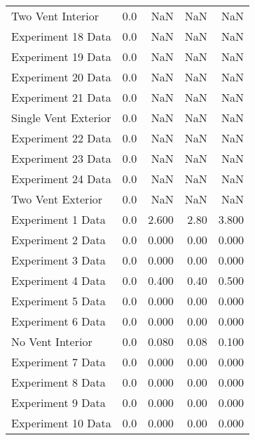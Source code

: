 \begin{tabular}{lrrrr}
Two Vent Interior    &       0.0 &              NaN &              NaN &        NaN \\
Experiment 18 Data   &       0.0 &              NaN &              NaN &        NaN \\
Experiment 19 Data   &       0.0 &              NaN &              NaN &        NaN \\
Experiment 20 Data   &       0.0 &              NaN &              NaN &        NaN \\
Experiment 21 Data   &       0.0 &              NaN &              NaN &        NaN \\
Single Vent Exterior &       0.0 &              NaN &              NaN &        NaN \\
Experiment 22 Data   &       0.0 &              NaN &              NaN &        NaN \\
Experiment 23 Data   &       0.0 &              NaN &              NaN &        NaN \\
Experiment 24 Data   &       0.0 &              NaN &              NaN &        NaN \\
Two Vent Exterior    &       0.0 &              NaN &              NaN &        NaN \\
Experiment 1 Data    &       0.0 &            2.600 &             2.80 &      3.800 \\
Experiment 2 Data    &       0.0 &            0.000 &             0.00 &      0.000 \\
Experiment 3 Data    &       0.0 &            0.000 &             0.00 &      0.000 \\
Experiment 4 Data    &       0.0 &            0.400 &             0.40 &      0.500 \\
Experiment 5 Data    &       0.0 &            0.000 &             0.00 &      0.000 \\
Experiment 6 Data    &       0.0 &            0.000 &             0.00 &      0.000 \\
No Vent Interior     &       0.0 &            0.080 &             0.08 &      0.100 \\
Experiment 7 Data    &       0.0 &            0.000 &             0.00 &      0.000 \\
Experiment 8 Data    &       0.0 &            0.000 &             0.00 &      0.000 \\
Experiment 9 Data    &       0.0 &            0.000 &             0.00 &      0.000 \\
Experiment 10 Data   &       0.0 &            0.000 &             0.00 &      0.000 \\

\end{tabular}
